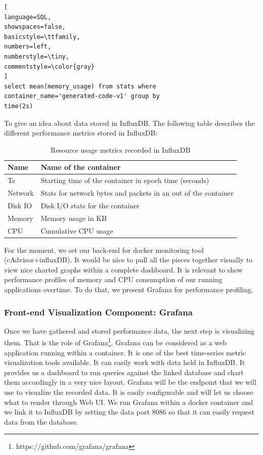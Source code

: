 \begin{lstlisting}[
language=SQL,
showspaces=false,
basicstyle=\ttfamily,
numbers=left,
numberstyle=\tiny,
commentstyle=\color{gray}
]
select mean(memory_usage) from stats where 
container_name='generated-code-v1' group by 
time(2s)
\end{lstlisting}
To give an idea about data stored in InfluxDB. The following table describes the different performance metrics stored in InfluxDB:
 \begin{table}[h]
 	\begin{center}
 		\begin{tabular}{|p{1cm}|p{6.9cm}|}
 			\hline
 			 Name & Name of the container \\
 			\hline
 			 Ts & Starting time of the container in epoch time (seconds) \\
 			\hline
 			 Network &  Stats for network bytes and packets in an out of the container \\
 			\hline
 			 Disk IO &  Disk I/O stats for the container \\
 			\hline
 			 Memory &  Memory usage in KB \\
 			
 			\hline
 		   	CPU &  Cumulative CPU usage \\
 			\hline
 			
 		\end{tabular}
 		
 	\end{center}
 	\caption {Resource usage metrics recorded in InfluxDB}
 \end{table}
For the moment, we set our back-end for docker monitoring tool (cAdvisor+influxDB). It would be nice to pull all the pieces together visually to view nice charted graphs within a complete dashboard. It is relevant to show performance profiles of memory and CPU consumption of our running applications overtime. To do that, we present Grafana for performance profiling. 

\subsubsection{Front-end Visualization Component: Grafana}
Once we have gathered and stored performance data, the next step is visualizing them. That is the role of Grafana\footnote{https://github.com/grafana/grafana}. Grafana can be considered as a web application running within a container. It is one of the best time-series metric visualization tools available. It can easily work with data held in InfluxDB. It provides us a dashboard to run queries against the linked database and chart them accordingly in a very nice layout. Grafana will be the endpoint that we will use to visualize the recorded data. It is easily configurable and will let us choose what to render through Web UI. We run Grafana within a docker container and we link it to InfluxDB by setting the data port 8086 so that it can easily request data from the database.

